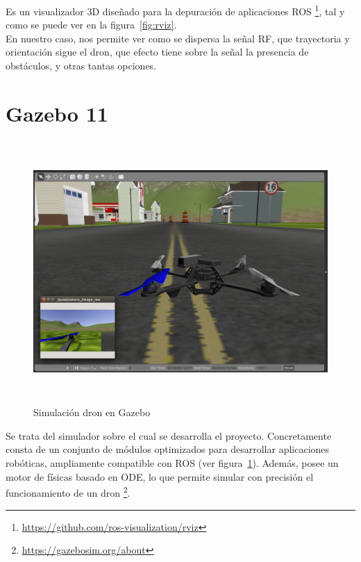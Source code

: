 Es un visualizador 3D diseñado para la depuración de aplicaciones \ac{ROS} \footnote[7]{\url{https://github.com/ros-visualization/rviz}}, tal y como se puede ver en la figura~\ref{fig:rviz}.\\

En nuestro caso, nos permite ver como se dispersa la señal \ac{RF}, que trayectoria y orientación sigue el dron, que efecto tiene sobre la señal la presencia de obstáculos, y otras tantas opciones.\\

\section{Gazebo 11}
\label{sec:gazebo}

\begin{figure} [t]
	\begin{center}
	\includegraphics[height=10cm]{imagenes/cap3/2_gazebo_drone.png}
	\end{center}
	\caption[Simulación dron en Gazebo]{Simulación dron en Gazebo}
	\label{fig:gazebo}
\end{figure}

Se trata del simulador sobre el cual se desarrolla el proyecto. Concretamente consta de un conjunto de módulos optimizados para desarrollar aplicaciones robóticas, ampliamente compatible con \ac{ROS} (ver figura~\ref{fig:gazebo}). Además, posee un motor de físicas basado en ODE, lo que permite simular con precisión el funcionamiento de un dron \footnote[8]{\url{https://gazebosim.org/about}}.\\


